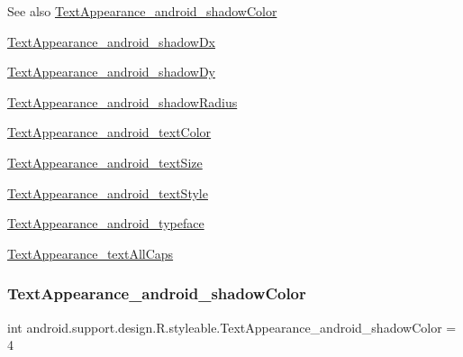 \begin{DoxySeeAlso}{See also}
\hyperlink{classandroid_1_1support_1_1design_1_1R_1_1styleable_a893f65ffb93f1abcb29dbaeac41edea4}{Text\+Appearance\+\_\+android\+\_\+shadow\+Color} 

\hyperlink{classandroid_1_1support_1_1design_1_1R_1_1styleable_a30a8e4e2699c781ee99129168187e77f}{Text\+Appearance\+\_\+android\+\_\+shadow\+Dx} 

\hyperlink{classandroid_1_1support_1_1design_1_1R_1_1styleable_aa0966b9f92f1a6c95b273b28b68eb9b4}{Text\+Appearance\+\_\+android\+\_\+shadow\+Dy} 

\hyperlink{classandroid_1_1support_1_1design_1_1R_1_1styleable_aadd2af965093afd5bbd56af5349e534d}{Text\+Appearance\+\_\+android\+\_\+shadow\+Radius} 

\hyperlink{classandroid_1_1support_1_1design_1_1R_1_1styleable_a94894b984b558f8b9a8b6fab3346043b}{Text\+Appearance\+\_\+android\+\_\+text\+Color} 

\hyperlink{classandroid_1_1support_1_1design_1_1R_1_1styleable_a360f5c584c9ab85d870c4a194a6822f1}{Text\+Appearance\+\_\+android\+\_\+text\+Size} 

\hyperlink{classandroid_1_1support_1_1design_1_1R_1_1styleable_a0a2a5b4e6900c18a9611ee403142f371}{Text\+Appearance\+\_\+android\+\_\+text\+Style} 

\hyperlink{classandroid_1_1support_1_1design_1_1R_1_1styleable_ab0453bf31379b054bdb8f41d7d5ec54b}{Text\+Appearance\+\_\+android\+\_\+typeface} 

\hyperlink{classandroid_1_1support_1_1design_1_1R_1_1styleable_ae246508ce6dc881e48a667cda664ad04}{Text\+Appearance\+\_\+text\+All\+Caps} 
\end{DoxySeeAlso}
\mbox{\label{classandroid_1_1support_1_1design_1_1R_1_1styleable_a893f65ffb93f1abcb29dbaeac41edea4}} 
\subsubsection{\texorpdfstring{Text\+Appearance\+\_\+android\+\_\+shadow\+Color}{TextAppearance\_android\_shadowColor}}
{\footnotesize\ttfamily int android.\+support.\+design.\+R.\+styleable.\+Text\+Appearance\+\_\+android\+\_\+shadow\+Color = 4\hspace{0.3cm}{\ttfamily [static]}}

